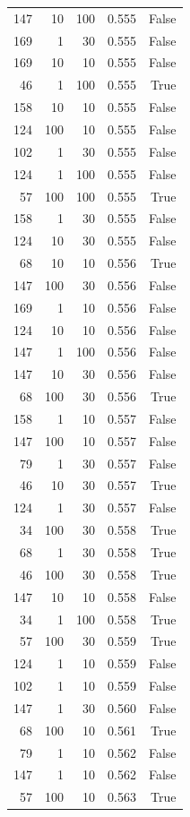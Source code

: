\begin{tabular}{rrrrr}
147 & 10 & 100 & 0.555 & False \\
169 & 1 & 30 & 0.555 & False \\
169 & 10 & 10 & 0.555 & False \\
46 & 1 & 100 & 0.555 & True \\
158 & 10 & 10 & 0.555 & False \\
124 & 100 & 10 & 0.555 & False \\
102 & 1 & 30 & 0.555 & False \\
124 & 1 & 100 & 0.555 & False \\
57 & 100 & 100 & 0.555 & True \\
158 & 1 & 30 & 0.555 & False \\
124 & 10 & 30 & 0.555 & False \\
68 & 10 & 10 & 0.556 & True \\
147 & 100 & 30 & 0.556 & False \\
169 & 1 & 10 & 0.556 & False \\
124 & 10 & 10 & 0.556 & False \\
147 & 1 & 100 & 0.556 & False \\
147 & 10 & 30 & 0.556 & False \\
68 & 100 & 30 & 0.556 & True \\
158 & 1 & 10 & 0.557 & False \\
147 & 100 & 10 & 0.557 & False \\
79 & 1 & 30 & 0.557 & False \\
46 & 10 & 30 & 0.557 & True \\
124 & 1 & 30 & 0.557 & False \\
34 & 100 & 30 & 0.558 & True \\
68 & 1 & 30 & 0.558 & True \\
46 & 100 & 30 & 0.558 & True \\
147 & 10 & 10 & 0.558 & False \\
34 & 1 & 100 & 0.558 & True \\
57 & 100 & 30 & 0.559 & True \\
124 & 1 & 10 & 0.559 & False \\
102 & 1 & 10 & 0.559 & False \\
147 & 1 & 30 & 0.560 & False \\
68 & 100 & 10 & 0.561 & True \\
79 & 1 & 10 & 0.562 & False \\
147 & 1 & 10 & 0.562 & False \\
57 & 100 & 10 & 0.563 & True \\

\end{tabular}

